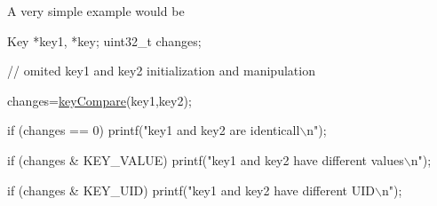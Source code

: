 \begin{DoxyParagraph}{A very simple example would be}

\begin{DoxyCode}
Key *key1, *key;
uint32\_t changes;

\textcolor{comment}{// omited key1 and key2 initialization and manipulation}

changes=\hyperlink{group__keytest_gab98168409d302fdb65692f6e26f17945}{keyCompare}(key1,key2);

\textcolor{keywordflow}{if} (changes == 0) printf(\textcolor{stringliteral}{"key1 and key2 are identicall\(\backslash\)n"});

\textcolor{keywordflow}{if} (changes & KEY\_VALUE)
        printf(\textcolor{stringliteral}{"key1 and key2 have different values\(\backslash\)n"});
 
\textcolor{keywordflow}{if} (changes & KEY\_UID)
        printf(\textcolor{stringliteral}{"key1 and key2 have different UID\(\backslash\)n"});
\end{DoxyCode}

\end{DoxyParagraph}

